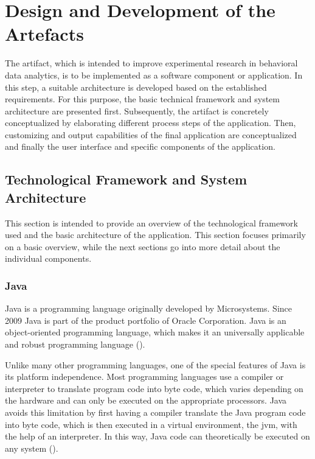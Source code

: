 \newpage\section{Design and Development of the Artefacts}

The artifact, which is intended to improve experimental research in behavioral data analytics, is to be implemented as a software component or application. In this step, a suitable architecture is developed based on the established requirements. For this purpose, the basic technical framework and system architecture are presented first. Subsequently, the artifact is concretely conceptualized by elaborating different process steps of the application. Then, customizing and output capabilities of the final application are conceptualized and finally the user interface and specific components of the application.

\subsection{Technological Framework and System Architecture}

This section is intended to provide an overview of the technological framework used and the basic architecture of the application. This section focuses primarily on a basic overview, while the next sections go into more detail about the individual components.

\subsubsection{Java}

Java is a programming language originally developed by Microsystems. Since 2009 Java is part of the product portfolio of Oracle Corporation. Java is an object-oriented programming language, which makes it an universally applicable and robust programming language (\cite{Ullenboom.2017}).

Unlike many other programming languages, one of the special features of Java is its platform independence. Most programming languages use a compiler or interpreter to translate program code into byte code, which varies depending on the hardware and can only be executed on the appropriate processors. Java avoids this limitation by first having a compiler translate the Java program code into byte code, which is then executed in a virtual environment, the \ac{jvm}, with the help of an interpreter. In this way, Java code can theoretically be executed on any system (\cite{Ullenboom.2017}).

